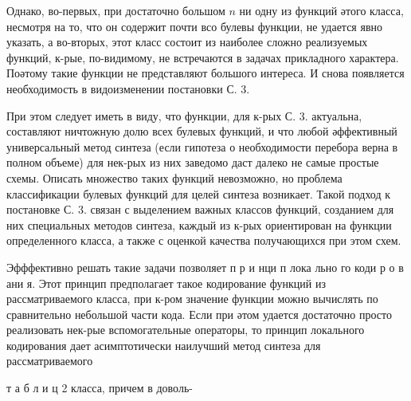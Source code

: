 \documentclass[10pt]{article}
\begin{document}
Однако, во-первых, при достаточно большом $n$ ни одну из функций әтого класса, несмотря на то, что он содержит почти всо булевы функции, не удается явно указать, а во-вторых, этот класс состоит из наиболее сложно реализуемых функций, к-рые, по-видимому, не встречаются в задачах прикладного характера. Поәтому такие функции не представляют большого интереса. И снова появляется необходимость в видоизменении постановки С. 3.



При этом следует иметь в виду, что функции, для к-рых С. 3. актуальна, составляют ничтожную долю всех булевых функций, и что любой әффективный универсальный метод синтеза (если гипотеза о необходимости перебора верна в полном объеме) для нек-рых из них заведомо даст далеко не самые простые схемы. Описать множество таких функций невозможно, но проблема классификации булевых функций для целей синтеза возникает. Такой подход к постановке С. 3. связан с выделением важных классов функций, созданием для них специальных методов синтеза, каждый из к-рых ориентирован на функции определенного класса, а также с оценкой качества получающихся при этом схем.



Эфффективно решать такие задачи позволяет п р и нци п лока льно го коди р о в ани я. Этот принцип предполагает такое кодирование функций из рассматриваемого класса, при к-ром значение функции можно вычислять по сравнительно небольшой части кода. Если при әтом удается достаточно просто реализовать нек-рые вспомогательные операторы, то принцип локального кодирования дает асимптотически наилучший метод синтеза для рассматриваемого



т а б л и ц 2 класса, причем в доволь-
\end{document}
